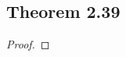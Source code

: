 \documentclass[../../main.tex]{subfiles}
\begin{document}
\subsection{Theorem 2.39}
\begin{wts}

\end{wts}
\begin{proof}

\end{proof}
\end{document}
